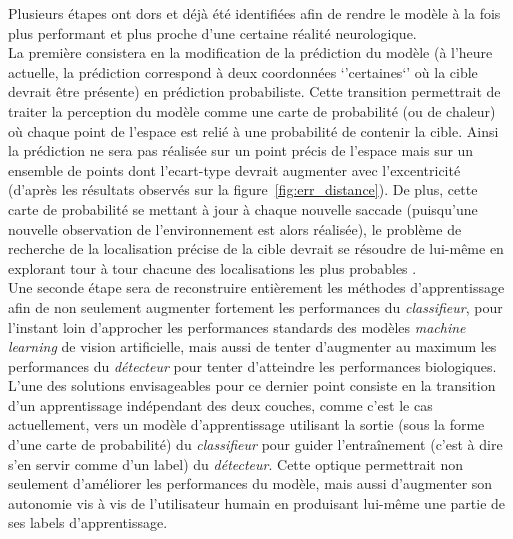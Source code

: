 Plusieurs étapes ont dors et déjà été identifiées afin de rendre le modèle à la fois plus performant et plus proche d'une certaine réalité neurologique. \\
La première consistera en la modification de la prédiction du modèle (à l'heure actuelle, la prédiction correspond à deux coordonnées `'certaines`' où la cible devrait être présente) en prédiction probabiliste. 
Cette transition permettrait de traiter la perception du modèle comme une carte de probabilité (ou de chaleur) où chaque point de l'espace est relié à une probabilité de contenir la cible. Ainsi la prédiction ne sera pas réalisée sur un point précis de l'espace mais sur un ensemble de points dont l'ecart-type devrait augmenter avec l'excentricité (d'après les résultats observés sur la figure~\ref{fig:err_distance}). De plus, cette carte de probabilité se mettant à jour à chaque nouvelle saccade (puisqu'une nouvelle observation de l'environnement est alors réalisée), le problème de recherche de la localisation précise de la cible devrait se résoudre de lui-même en explorant tour à tour chacune des localisations les plus probables \autocite{Butko2010, Najemnik2005}.\\

Une seconde étape sera de reconstruire entièrement les méthodes d'apprentissage afin de non seulement augmenter fortement les performances du \textit{classifieur}, pour l'instant loin d'approcher les performances standards des modèles \textit{machine learning} de vision artificielle, mais aussi de tenter d'augmenter au maximum les performances du \textit{détecteur} pour tenter d'atteindre les performances biologiques. \\
L'une des solutions envisageables pour ce dernier point consiste en la transition d'un apprentissage indépendant des deux couches, comme c'est le cas actuellement, vers un modèle d'apprentissage utilisant la sortie (sous la forme d'une carte de probabilité) du \textit{classifieur} pour guider l'entraînement (c'est à dire s'en servir comme d'un label) du \textit{détecteur}. Cette optique permettrait non seulement d'améliorer les performances du modèle, mais aussi d'augmenter son autonomie vis à vis de l'utilisateur humain en produisant lui-même une partie de ses labels d'apprentissage. \\

